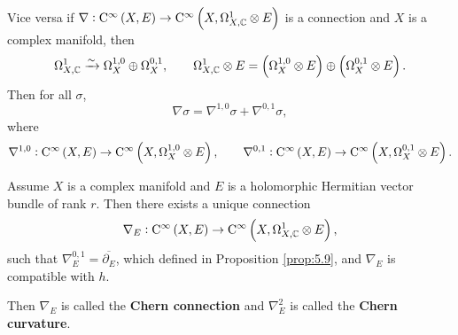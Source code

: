 Vice versa if $ \nabla : \C^\infty\br{X, E} \to \C^\infty\br{X, \Omega_{X, \CC}^1 \otimes E} $ is a connection and $ X $ is a complex manifold, then
$$ \Omega_{X, \CC}^1 \xrightarrow{\sim} \Omega_X^{1, 0} \oplus \Omega_X^{0, 1}, \qquad \Omega_{X, \CC}^1 \otimes E = \br{\Omega_X^{1, 0} \otimes E} \oplus \br{\Omega_X^{0, 1} \otimes E}. $$
Then for all $ \sigma $,
$$ \nabla\sigma = \nabla^{1, 0}\sigma + \nabla^{0, 1}\sigma, $$
where
$$ \nabla^{1, 0} : \C^\infty\br{X, E} \to \C^\infty\br{X, \Omega_X^{1, 0} \otimes E}, \qquad \nabla^{0, 1} : \C^\infty\br{X, E} \to \C^\infty\br{X, \Omega_X^{0, 1} \otimes E}. $$

\begin{theorem}
Assume $ X $ is a complex manifold and $ E $ is a holomorphic Hermitian vector bundle of rank $ r $. Then there exists a unique connection
$$ \nabla_E : \C^\infty\br{X, E} \to \C^\infty\br{X, \Omega_{X, \CC}^1 \otimes E}, $$
such that $ \nabla_E^{0, 1} = \overline{\partial_E} $, which defined in Proposition \ref{prop:5.9}, and $ \nabla_E $ is compatible with $ h $.
\end{theorem}

Then $ \nabla_E $ is called the \textbf{Chern connection} and $ \nabla_E^2 $ is called the \textbf{Chern curvature}.

